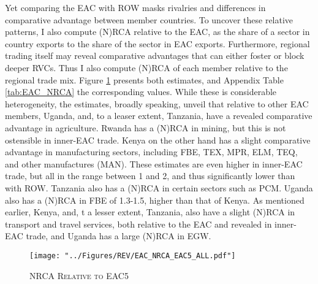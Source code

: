 \documentclass[a4paper]{article}
\begin{document}
Yet comparing the EAC with ROW masks rivalries and differences in comparative advantage between member countries. To uncover these relative patterns, I also compute (N)RCA relative to the EAC, as the share of a sector in country exports to the share of the sector in EAC exports. Furthermore, regional trading itself may reveal comparative advantages that can either foster or block deeper RVCs. Thus I also compute (N)RCA of each member relative to the regional trade mix. Figure \ref{fig:EAC_NRCA} presents both estimates, and Appendix Table \ref{tab:EAC_NRCA} the corresponding values. While these is considerable heterogeneity, the estimates, broadly speaking, unveil that relative to other EAC members, Uganda, and, to a leaser extent, Tanzania, have a revealed comparative advantage in agriculture. Rwanda has a (N)RCA in mining, but this is not ostensible in inner-EAC trade. Kenya on the other hand has a slight comparative advantage in manufacturing sectors, including FBE, TEX, MPR, ELM, TEQ, and other manufactures (MAN). These estimates are even higher in inner-EAC trade, but all in the range between 1 and 2, and thus significantly lower than with ROW. Tanzania also has a (N)RCA in certain sectors such as PCM. Uganda also has a (N)RCA in FBE of 1.3-1.5, higher than that of Kenya. As mentioned earlier, Kenya, and, t a lesser extent, Tanzania, also have a slight (N)RCA in transport and travel services, both relative to the EAC and revealed in inner-EAC trade, and Uganda has a large (N)RCA in EGW.

\begin{figure}[h!]
\centering
\caption{\label{fig:EAC_NRCA}\textsc{NRCA Relative to EAC5}}
\texttt{[image: "../Figures/REV/EAC\_NRCA\_EAC5\_ALL.pdf"]} %
\end{figure}
\FloatBarrier
\end{document}
